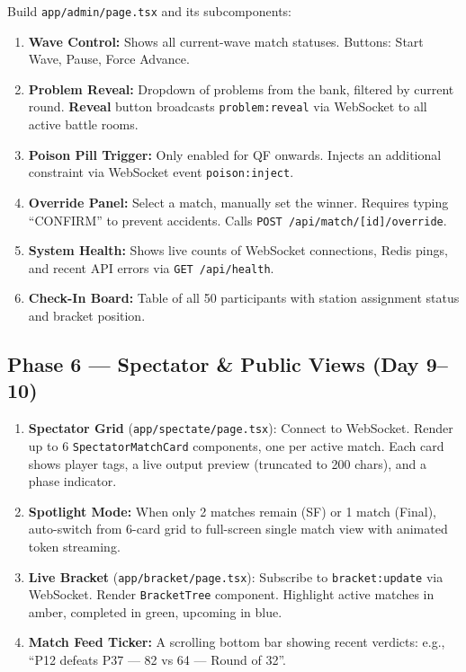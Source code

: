 \documentclass[11pt, a4paper]{article}
\begin{document}
\begin{tcolorbox}[phasebox=alertred, title={Goal: Full admin control panel}]
Build \texttt{app/admin/page.tsx} and its subcomponents:
\begin{enumerate}[leftmargin=1cm, itemsep=3pt]
    \item \textbf{Wave Control:} Shows all current-wave match statuses. Buttons: Start Wave, Pause, Force Advance.
    \item \textbf{Problem Reveal:} Dropdown of problems from the bank, filtered by current round. \textbf{Reveal} button broadcasts \texttt{problem:reveal} via WebSocket to all active battle rooms.
    \item \textbf{Poison Pill Trigger:} Only enabled for QF onwards. Injects an additional constraint via WebSocket event \texttt{poison:inject}.
    \item \textbf{Override Panel:} Select a match, manually set the winner. Requires typing ``CONFIRM'' to prevent accidents. Calls \texttt{POST /api/match/[id]/override}.
    \item \textbf{System Health:} Shows live counts of WebSocket connections, Redis pings, and recent API errors via \texttt{GET /api/health}.
    \item \textbf{Check-In Board:} Table of all 50 participants with station assignment status and bracket position.
\end{enumerate}
\end{tcolorbox}

\subsection{Phase 6 --- Spectator \& Public Views (Day 9--10)}

\begin{tcolorbox}[phasebox=monggreen, title={Goal: Audience-facing live views}]
\begin{enumerate}[leftmargin=1cm, itemsep=3pt]
    \item \textbf{Spectator Grid} (\texttt{app/spectate/page.tsx}): Connect to WebSocket. Render up to 6 \texttt{SpectatorMatchCard} components, one per active match. Each card shows player tags, a live output preview (truncated to 200 chars), and a phase indicator.
    \item \textbf{Spotlight Mode:} When only 2 matches remain (SF) or 1 match (Final), auto-switch from 6-card grid to full-screen single match view with animated token streaming.
    \item \textbf{Live Bracket} (\texttt{app/bracket/page.tsx}): Subscribe to \texttt{bracket:update} via WebSocket. Render \texttt{BracketTree} component. Highlight active matches in amber, completed in green, upcoming in blue.
    \item \textbf{Match Feed Ticker:} A scrolling bottom bar showing recent verdicts: e.g., ``P12 defeats P37 --- 82 vs 64 --- Round of 32''.
\end{enumerate}
\end{tcolorbox}
\end{document}
